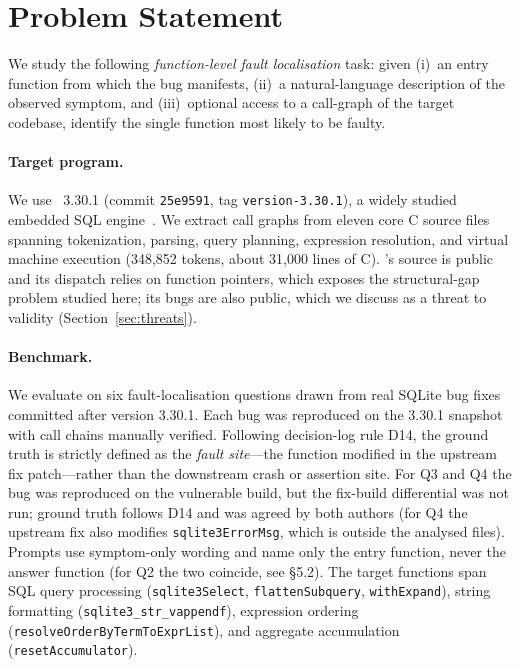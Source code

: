 \section{Problem Statement}
\label{sec:problem}

We study the following \emph{function-level fault localisation} task: given
(i)~an entry function from which the bug manifests, (ii)~a natural-language
description of the observed symptom, and (iii)~optional access to a call-graph
of the target codebase, identify the single function most likely to be faulty.

\paragraph{Target program.}
We use \sqlite~3.30.1 (commit \texttt{25e9591}, tag \texttt{version-3.30.1}),
a widely studied embedded SQL engine~\cite{sqlite}.
We extract call graphs from eleven core C source files spanning tokenization,
parsing, query planning, expression resolution, and virtual machine execution
(348{,}852 tokens, about 31{,}000 lines of C).
\sqlite's source is public and its dispatch relies on function pointers,
which exposes the structural-gap problem studied here; its bugs are also public,
which we discuss as a threat to validity (Section~\ref{sec:threats}).

\paragraph{Benchmark.}
We evaluate on six fault-localisation questions drawn from real SQLite bug fixes
committed after version 3.30.1.
Each bug was reproduced on the 3.30.1 snapshot with call chains manually verified.
Following decision-log rule D14, the ground truth is strictly defined as
the \emph{fault site}---the function modified in the upstream fix patch---rather than
the downstream crash or assertion site.
For Q3 and Q4 the bug was reproduced on the vulnerable build, but the fix-build differential
was not run; ground truth follows D14 and was agreed by both authors (for Q4 the upstream fix
also modifies \texttt{sqlite3ErrorMsg}, which is outside the analysed files).
Prompts use symptom-only wording and name only the entry function, never the answer function (for Q2 the two coincide, see \S5.2).
The target functions span SQL query processing (\texttt{sqlite3Select},
\texttt{flattenSubquery}, \texttt{withExpand}), string formatting
(\texttt{sqlite3\_str\_vappendf}), expression ordering
(\texttt{resolveOrderByTermToExprList}), and aggregate accumulation
(\texttt{resetAccumulator}).

